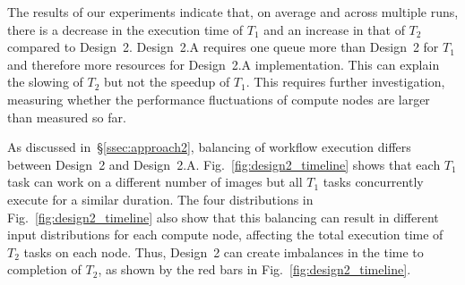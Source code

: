 The results of our experiments indicate that, on average and across multiple runs, there is a decrease in the execution time of $T_{1}$ and an increase in that of $T_{2}$ compared to Design~2.
Design~2.A requires one queue more than Design~2 for $T_{1}$ and therefore more resources for Design~2.A implementation.
This can explain the slowing of $T_{2}$ but not the speedup of $T_{1}$.
This requires further investigation, measuring whether the performance fluctuations of compute nodes are larger than measured so far.


As discussed in~\S\ref{ssec:approach2}, balancing of workflow execution differs between Design~2 and Design~2.A. Fig.~\ref{fig:design2_timeline} shows that each $T_{1}$ task can work on a different number of images but all $T_{1}$ tasks concurrently execute for a similar duration.
The four distributions in Fig.~\ref{fig:design2_timeline} also show that this balancing can result in different input distributions for each compute node, affecting the total execution time of $T_{2}$ tasks on each node.
Thus, Design~2 can create imbalances in the time to completion of $T_{2}$, as shown by the red bars in Fig.~\ref{fig:design2_timeline}.


